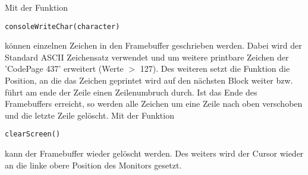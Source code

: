 \documentclass[a4paper,10pt]{scrartcl}
\begin{document}
Mit der Funktion 
\begin{verbatim} 
consoleWriteChar(character)
\end{verbatim}
können einzelnen Zeichen in den
Framebuffer geschrieben
werden. Dabei wird der Standard ASCII Zeichensatz verwendet und um weitere
printbare Zeichen der 'CodePage 437' erweitert (Werte $>$ 127). Des weiteren
setzt die Funktion die Position, an die das Zeichen
geprintet wird auf den nächsten Block weiter bzw. führt am ende der Zeile einen
Zeilenumbruch durch.
Ist das Ende des Framebuffers erreicht, so werden alle Zeichen um eine Zeile
nach oben verschoben und die letzte Zeile gelöscht.
Mit der Funktion
\begin{verbatim} 
clearScreen()
\end{verbatim}
kann der Framebuffer wieder gelöscht werden. Des weiters wird der Cursor wieder
an die linke obere Position des Monitors gesetzt.
\end{document}
